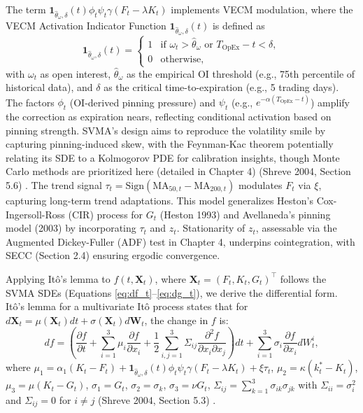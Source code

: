 \documentclass[12pt]{report}
\begin{document}
The term \(\mathbf{1}_{\hat{\theta}_\omega, \delta}(t) \phi_t \psi_t \gamma (F_t - \lambda K_t)\) implements VECM modulation, where the VECM Activation Indicator Function \(\mathbf{1}_{\hat{\theta}_\omega, \delta}(t)\) is defined as
\[
\mathbf{1}_{\hat{\theta}_\omega, \delta}(t) =
\begin{cases}
    1 & \text{if } \omega_t > \hat{\theta}_\omega \text{ or } T_{\text{OpEx}} - t < \delta, \\
    0 & \text{otherwise},
\end{cases}
\]
with \(\omega_t\) as open interest, \(\hat{\theta}_\omega\) as the empirical OI threshold (e.g., 75th percentile of historical data), and \(\delta\) as the critical time-to-expiration (e.g., 5 trading days). The factors \(\phi_t\) (OI-derived pinning pressure) and \(\psi_t\) (e.g., \(e^{-\alpha (T_{\text{OpEx}} - t)}\)) amplify the correction as expiration nears, reflecting conditional activation based on pinning strength. SVMA’s design aims to reproduce the volatility smile by capturing pinning-induced skew, with the Feynman-Kac theorem potentially relating its SDE to a Kolmogorov PDE for calibration insights, though Monte Carlo methods are prioritized here (detailed in Chapter 4) (Shreve 2004, Section 5.6) \cite{shreve2004}. The trend signal \(\tau_t = \text{Sign}(\text{MA}_{50,t} - \text{MA}_{200,t})\) modulates \(F_t\) via \(\xi\), capturing long-term trend adaptations. This model generalizes Heston’s Cox-Ingersoll-Ross (CIR) process for \(G_t\) (Heston 1993) \cite{heston1993closed} and Avellaneda’s pinning model (2003) \cite{avellaneda2003} by incorporating \(\tau_t\) and \(z_t\). Stationarity of \(z_t\), assessable via the Augmented Dickey-Fuller (ADF) test in Chapter 4, underpins cointegration, with SECC (Section 2.4) ensuring ergodic convergence.

\vspace{0.2in}

Applying Itô’s lemma to \(f(t, \mathbf{X}_t)\), where \(\mathbf{X}_t = (F_t, K_t, G_t)^\top\) follows the SVMA SDEs (Equations \ref{eq:df_t}–\ref{eq:dg_t}), we derive the differential form. Itô’s lemma for a multivariate Itô process states that for \(d\mathbf{X}_t = \mu(\mathbf{X}_t) dt + \sigma(\mathbf{X}_t) d\mathbf{W}_t\), the change in \(f\) is:
\begin{equation}
    df = \left( \frac{\partial f}{\partial t} + \sum_{i=1}^3 \mu_i \frac{\partial f}{\partial x_i} + \frac{1}{2} \sum_{i,j=1}^3 \Sigma_{ij} \frac{\partial^2 f}{\partial x_i \partial x_j} \right) dt + \sum_{i=1}^3 \sigma_i \frac{\partial f}{\partial x_i} dW_t^i, \label{eq:ito_multivariate}
\end{equation}
where \(\mu_1 = \alpha_1 (K_t - F_t) + \mathbf{1}_{\hat{\theta}_\omega, \delta}(t) \phi_t \psi_t \gamma (F_t - \lambda K_t) + \xi \tau_t\), \(\mu_2 = \kappa (k_t^* - K_t)\), \(\mu_3 = \mu (K_t - G_t)\), \(\sigma_1 = G_t\), \(\sigma_2 = \sigma_k\), \(\sigma_3 = \nu G_t\), \(\Sigma_{ij} = \sum_{k=1}^3 \sigma_{ik} \sigma_{jk}\) with \(\Sigma_{ii} = \sigma_i^2\) and \(\Sigma_{ij} = 0\) for \(i \neq j\) (Shreve 2004, Section 5.3) \cite{shreve2004}.
\end{document}
